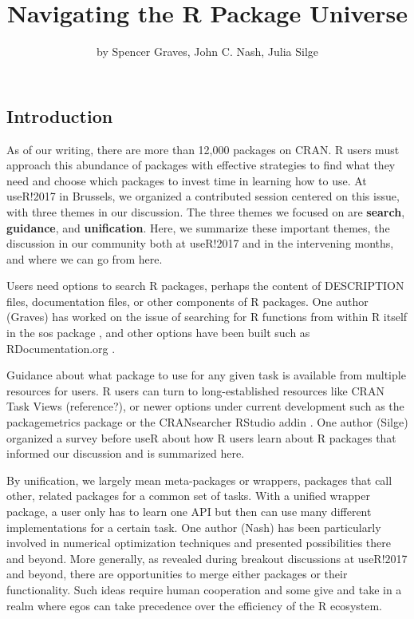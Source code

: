 \title{Navigating the R Package Universe}
\author{by Spencer Graves, John C. Nash, Julia Silge}

\maketitle


\subsection{Introduction}\label{introduction}

As of our writing, there are more than 12,000 packages on CRAN. R users
must approach this abundance of packages with effective strategies to
find what they need and choose which packages to invest time in learning
how to use. At useR!2017 in Brussels, we organized a contributed session
centered on this issue, with three themes in our discussion. The three
themes we focused on are \textbf{search}, \textbf{guidance}, and
\textbf{unification}. Here, we summarize these important themes, the
discussion in our community both at useR!2017 and in the intervening
months, and where we can go from here.

Users need options to search R packages, perhaps the content of
DESCRIPTION files, documentation files, or other components of R
packages. One author (Graves) has worked on the issue of searching for R
functions from within R itself in the sos package \citep{sos}, and other
options have been built such as RDocumentation.org
\citep{rdocumentation}.

Guidance about what package to use for any given task is available from
multiple resources for users. R users can turn to long-established
resources like CRAN Task Views (reference?), or newer options under
current development such as the packagemetrics package
\citep{packagemetrics} or the CRANsearcher RStudio addin
\citep{cransearcher}. One author (Silge) organized a survey before useR
about how R users learn about R packages that informed our discussion
and is summarized here.

By unification, we largely mean meta-packages or wrappers, packages that
call other, related packages for a common set of tasks. With a unified
wrapper package, a user only has to learn one API but then can use many
different implementations for a certain task. One author (Nash) has been
particularly involved in numerical optimization techniques and presented
possibilities there and beyond. More generally, as revealed during
breakout discussions at useR!2017 and beyond, there are opportunities to
merge either packages or their functionality. Such ideas require human
cooperation and some give and take in a realm where egos can take
precedence over the efficiency of the R ecosystem.


